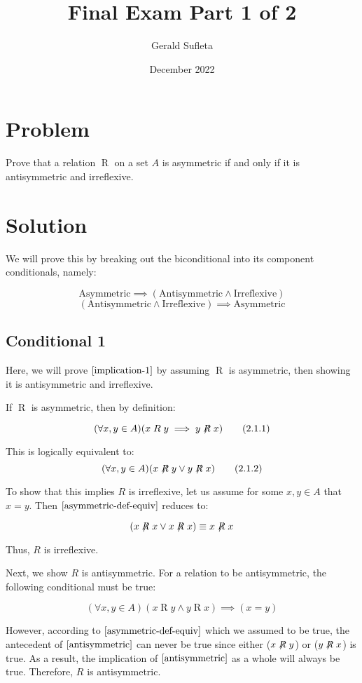 \documentclass{article}
\title{Final Exam Part 1 of 2}
\author{Gerald Sufleta}
\date{December 2022}
\begin{document}
\maketitle

\section{Problem}
Prove that a relation $\mathrel{R}$ on a set $A$ is asymmetric if and only if it is antisymmetric and irreflexive.

\section{Solution}
We will prove this by breaking out the biconditional into its component conditionals, namely:

\[
\text{Asymmetric} \implies (\text{Antisymmetric} \land \text{Irreflexive}) \tag{1}\label{implication-1}
\]
\[
(\text{Antisymmetric} \land \text{Irreflexive}) \implies \text{Asymmetric} \tag{2}\label{implication-2}
\]

\subsection{Conditional 1}
Here, we will prove $\eqref{implication-1}$ by assuming $\mathrel{R}$ is asymmetric, then showing it is antisymmetric and irreflexive.

If $\mathrel{R}$ is asymmetric, then by definition:

\[
(\forall x,y \in A) (x \mathrel{R} y \implies y\not\mathrel{R} x) \tag{2.1.1}\label{asymmetric-def}
\]

This is logically equivalent to:
\[
(\forall x,y \in A)(x\not\mathrel{R} y \lor y \not\mathrel{R} x) \tag{2.1.2}\label{asymmetric-def-equiv}
\]

To show that this implies $R$ is irreflexive, let us assume for some $x,y \in A$ that $x = y$. Then $\eqref{asymmetric-def-equiv}$ reduces to:

\[
(x \not\mathrel{R} x \lor x \not\mathrel{R} x) \equiv x \not\mathrel{R} x 
\]

Thus, $R$ is irreflexive.

Next, we show $R$ is antisymmetric. For a relation to be antisymmetric, the following conditional must be true:

\[
(\forall x,y \in A)(x \mathrel{R} y \land y \mathrel{R} x) \implies (x=y) \tag{2.1.3}\label{antisymmetric}
\]

However, according to $\eqref{asymmetric-def-equiv}$ which we assumed to be true, the antecedent of $\eqref{antisymmetric}$ can never be true since either ($x \not\mathrel{R} y$) or ($y \not\mathrel{R} x$) is true. As a result, the implication of $\eqref{antisymmetric}$ as a whole will always be true. Therefore, $R$ is antisymmetric.
\end{document}
